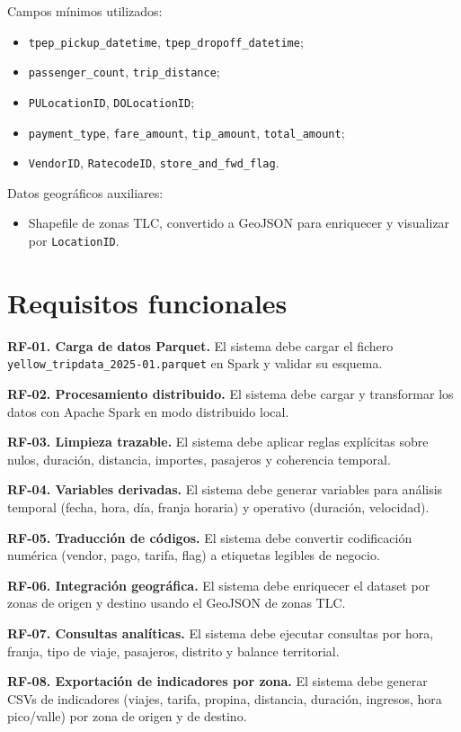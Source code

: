 Campos mínimos utilizados:
\begin{itemize}
	\item \texttt{tpep\_pickup\_datetime}, \texttt{tpep\_dropoff\_datetime};
	\item \texttt{passenger\_count}, \texttt{trip\_distance};
	\item \texttt{PULocationID}, \texttt{DOLocationID};
	\item \texttt{payment\_type}, \texttt{fare\_amount}, \texttt{tip\_amount},
	\texttt{total\_amount};
	\item \texttt{VendorID}, \texttt{RatecodeID}, \texttt{store\_and\_fwd\_flag}.
\end{itemize}

Datos geográficos auxiliares:
\begin{itemize}
	\item Shapefile de zonas TLC, convertido a GeoJSON para enriquecer y visualizar
	por \texttt{LocationID}.
\end{itemize}

\section{Requisitos funcionales}
\textbf{RF-01. Carga de datos Parquet.} El sistema debe cargar el fichero
\texttt{yellow\_tripdata\_2025-01.parquet} en Spark y validar su esquema.

\textbf{RF-02. Procesamiento distribuido.} El sistema debe cargar y transformar los
datos con Apache Spark en modo distribuido local.

\textbf{RF-03. Limpieza trazable.} El sistema debe aplicar reglas explícitas sobre
nulos, duración, distancia, importes, pasajeros y coherencia temporal.

\textbf{RF-04. Variables derivadas.} El sistema debe generar variables para análisis
temporal (fecha, hora, día, franja horaria) y operativo (duración, velocidad).

\textbf{RF-05. Traducción de códigos.} El sistema debe convertir codificación numérica
(vendor, pago, tarifa, flag) a etiquetas legibles de negocio.

\textbf{RF-06. Integración geográfica.} El sistema debe enriquecer el dataset por
zonas de origen y destino usando el GeoJSON de zonas TLC.

\textbf{RF-07. Consultas analíticas.} El sistema debe ejecutar consultas por hora,
franja, tipo de viaje, pasajeros, distrito y balance territorial.

\textbf{RF-08. Exportación de indicadores por zona.} El sistema debe generar CSVs de
indicadores (viajes, tarifa, propina, distancia, duración, ingresos, hora pico/valle)
por zona de origen y de destino.

